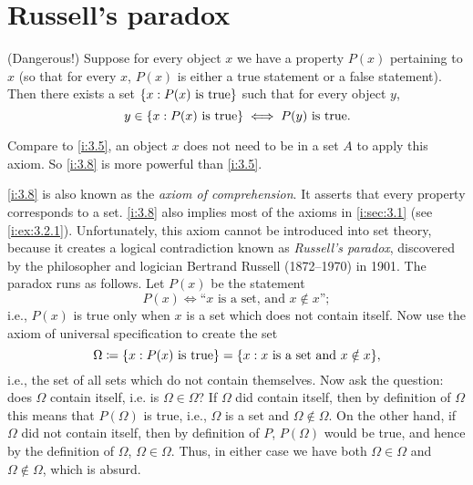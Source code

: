 \section{Russell's paradox}\label{i:sec:3.2}

\begin{ax}\label{i:3.8}
  (Dangerous!)
  Suppose for every object \(x\) we have a property \(P(x)\) pertaining to \(x\) (so that for every \(x\), \(P(x)\) is either a true statement or a false statement).
  Then there exists a set \(\left\lbrace x : P(x) \text{ is true}\right\rbrace\) such that for every object \(y\),
  \[
    y \in \left\lbrace x : P(x) \text{ is true}\right\rbrace \iff P(y) \text{ is true}.
  \]
\end{ax}

\begin{note}
  Compare to \cref{i:3.5}, an object \(x\) does not need to be in a set \(A\) to apply this axiom.
  So \cref{i:3.8} is more powerful than \cref{i:3.5}.
\end{note}

\begin{note}
  \cref{i:3.8} is also known as the \emph{axiom of comprehension}.
  It asserts that every property corresponds to a set.
  \cref{i:3.8} also implies most of the axioms in \cref{i:sec:3.1} (see \cref{i:ex:3.2.1}).
  Unfortunately, this axiom cannot be introduced into set theory, because it creates a logical contradiction known as \emph{Russell's paradox}, discovered by the philosopher and logician Bertrand Russell (1872--1970) in 1901.
  The paradox runs as follows.
  Let \(P(x)\) be the statement
  \[
    P(x) \iff \text{``\(x\) is a set, and \(x \notin x\)''};
  \]
  i.e., \(P(x)\) is true only when \(x\) is a set which does not contain itself.
  Now use the axiom of universal specification to create the set
  \[
    \Omega \coloneqq \set{x : P(x) \text{ is true}} = \set{x : x \text{ is a set and } x \notin x},
  \]
  i.e., the set of all sets which do not contain themselves.
  Now ask the question: does \(\Omega\) contain itself, i.e. is \(\Omega \in \Omega\)?
  If \(\Omega\) did contain itself, then by definition of \(\Omega\) this means that \(P(\Omega)\) is true, i.e., \(\Omega\) is a set and \(\Omega \notin \Omega\).
  On the other hand, if \(\Omega\) did not contain itself, then by definition of \(P\), \(P(\Omega)\) would be true, and hence by the definition of \(\Omega\), \(\Omega \in \Omega\).
  Thus, in either case we have both \(\Omega \in \Omega\) and \(\Omega \notin \Omega\), which is absurd.
\end{note}

